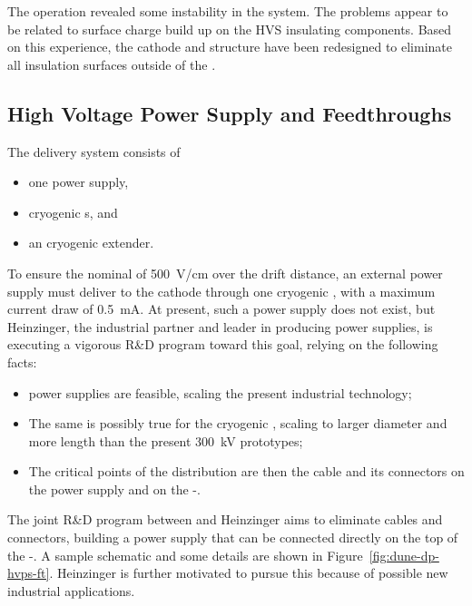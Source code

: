 The  operation revealed some instability in the  system.  The problems appear to be related to surface charge build up on the HVS insulating components. Based on this experience, the \dual cathode and  structure have been redesigned to eliminate all insulation surfaces outside of the .    


\subsection {High Voltage Power Supply and Feedthroughs}
The  delivery system consists of
\begin{itemize}
\item one power supply,
\item {} cryogenic \fdth{}s, and
\item an  cryogenic extender.
\end{itemize}

To ensure the nominal \efield of \SI{500}{\V/\cm} over  the \dpmaxdrift drift distance, an external power supply must deliver \dptargetdriftvoltneg to  the cathode through one  cryogenic \fdth, with a maximum current draw of \SI{0.5}{\milli\ampere}.
At present, such a power supply does not exist, but  Heinzinger, the industrial partner and leader in producing  power supplies, is executing a vigorous R\&D program toward this goal, relying on the following facts:

\begin{itemize}
\item \dptargetdriftvoltpos power supplies are feasible, scaling the present industrial technology;
\item The same is possibly true for the  cryogenic \fdth, scaling to larger diameter and more length than the present \SI{300}{\kV} prototypes;
\item The critical points of the  distribution are then the cable and its connectors on the power supply and on the -\fdth. 
\end{itemize}

The joint R\&D program between  and Heinzinger aims to eliminate cables and connectors, building a power supply that can be connected directly on the top of the -\fdth.  A sample schematic and some details are shown in Figure~\ref{fig:dune-dp-hvps-ft}. 
Heinzinger is further motivated to pursue this because of possible new industrial applications.

